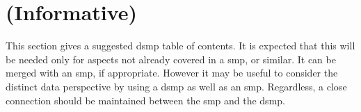 %
%
\chapter{ (Informative)} \label{bkm:plan}


This section gives a suggested \gls{dsmp} table of contents. It is expected that this will be needed only for aspects not already covered in a \gls{smp}, or similar. It can be merged with an \gls{smp}, if appropriate. However it may be useful to consider the distinct data perspective by using a \gls{dsmp} as well as an \gls{smp}. Regardless, a close connection should be maintained between the \gls{smp} and the \gls{dsmp}.

